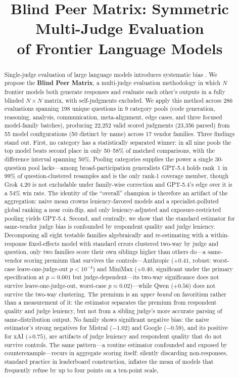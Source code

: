 \documentclass{article}
\title{Blind Peer Matrix: Symmetric Multi-Judge Evaluation\\of Frontier Language Models}
\begin{document}
\maketitle

\begin{abstract}
Single-judge evaluation of large language models introduces systematic bias \citep{zheng2023judging}. We propose the \textbf{Blind Peer Matrix}, a multi-judge evaluation methodology in which $N$ frontier models both generate responses and evaluate each other's outputs in a fully blinded $N \times N$ matrix, with self-judgments excluded. We apply this method across 286 evaluations spanning 198 unique questions in 9 category pools (code generation, reasoning, analysis, communication, meta-alignment, edge cases, and three focused model-family batches), producing 22,252 valid scored judgments (23,356 parsed) from 55 model configurations (50 distinct by name) across 17 vendor families. Three findings stand out. First, no category has a statistically separated winner: in all nine pools the top model beats second place in only 50--58\% of matched comparisons, with the difference interval spanning 50\%. Pooling categories supplies the power a single 30-question pool lacks---among broad-participation generalists GPT-5.4 holds rank~1 in 99\% of question-clustered resamples and is the only rank-1 coverage member, though Grok 4.20 is not excludable under family-wise correction and GPT-5.4's edge over it is a 54\% win rate. The identity of the ``overall'' champion is therefore an artifact of the aggregation: naive mean crowns leniency-favored models and a specialist-polluted global ranking a near coin-flip, and only leniency-adjusted and exposure-restricted pooling yields GPT-5.4. Second, and centrally, we show that the standard estimator for same-vendor judge bias is confounded by respondent quality and judge leniency. Decomposing all eight testable families algebraically and re-estimating with a within-response fixed-effects model with standard errors clustered two-way by judge and question, only two families score their own siblings higher than others do---a same-vendor scoring premium that survives the controls---Anthropic ($+0.41$, robust: worst-case leave-one-judge-out $p < 10^{-4}$) and MiniMax ($+0.40$, significant under the primary specification at $p = 0.001$ but judge-dependent---its two-way significance does not survive leave-one-judge-out, worst-case $p \approx 0.02$)---while Qwen ($+0.56$) does not survive the two-way clustering. The premium is an \emph{upper bound} on favoritism rather than a measurement of it: the estimator separates the premium from respondent quality and judge leniency, but not from a sibling judge's more accurate parsing of same-distribution output. No family shows significant negative bias: the naive estimator's strong negatives for Mistral ($-1.02$) and Google ($-0.59$), and its positive for xAI ($+0.75$), are artifacts of judge leniency and respondent quality that do not survive controls. The same pattern---a routine estimator confounded and exposed by counterexample---recurs in aggregate scoring itself: silently discarding non-responses, standard practice in leaderboard construction, inflates the mean of models that frequently refuse by up to four points on a ten-point scale, 
\end{abstract}
\end{document}
